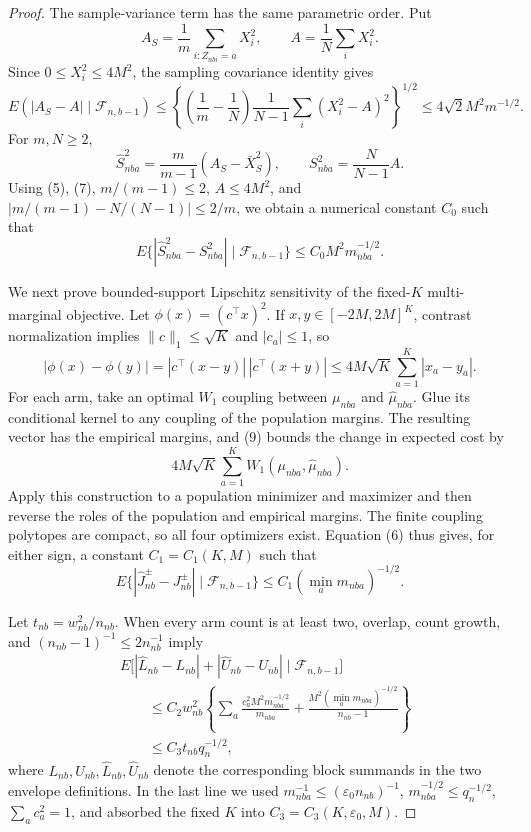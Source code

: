 \documentclass{article}
\begin{document}
\begin{proof}
The sample-variance term has the same parametric order. Put
\[
A_S=\frac1m\sum_{i:Z_{nbi}=a}X_i^2,
\qquad A=\frac1N\sum_iX_i^2.
\]
Since \(0\le X_i^2\le4M^2\), the sampling covariance identity gives
\[
E(|A_S-A|\mid\mathcal F_{n,b-1})
\le\left\{\left(\frac1m-\frac1N\right)
\frac1{N-1}\sum_i(X_i^2-A)^2\right\}^{1/2}
\le4\sqrt2 M^2m^{-1/2}.
\tag{7}
\]
For \(m,N\ge2\),
\[
\widehat S_{nba}^2=\frac{m}{m-1}(A_S-\bar X_S^2),
\qquad S_{nba}^2=\frac{N}{N-1}A.
\]
Using (5), (7), \(m/(m-1)\le2\), \(A\le4M^2\), and
\(|m/(m-1)-N/(N-1)|\le2/m\), we obtain a numerical constant \(C_0\) such that
\[
E\{|\widehat S_{nba}^2-S_{nba}^2|\mid\mathcal F_{n,b-1}\}
\le C_0M^2m_{nba}^{-1/2}.
\tag{8}
\]

We next prove bounded-support Lipschitz sensitivity of the fixed-\(K\) multi-marginal objective. Let \(\phi(x)=(c^\top x)^2\). If \(x,y\in[-2M,2M]^K\), contrast normalization implies \(\|c\|_1\le\sqrt K\) and \(|c_a|\le1\), so
\[
|\phi(x)-\phi(y)|
=|c^\top(x-y)|\,|c^\top(x+y)|
\le4M\sqrt K\sum_{a=1}^K|x_a-y_a|.
\tag{9}
\]
For each arm, take an optimal \(W_1\) coupling between \(\mu_{nba}\) and \(\widehat\mu_{nba}\). Glue its conditional kernel to any coupling of the population margins. The resulting vector has the empirical margins, and (9) bounds the change in expected cost by
\[
4M\sqrt K\sum_{a=1}^K W_1(\mu_{nba},\widehat\mu_{nba}).
\]
Apply this construction to a population minimizer and maximizer and then reverse the roles of the population and empirical margins. The finite coupling polytopes are compact, so all four optimizers exist. Equation (6) thus gives, for either sign, a constant \(C_1=C_1(K,M)\) such that
\[
E\{|\widehat J_{nb}^{\pm}-J_{nb}^{\pm}|\mid\mathcal F_{n,b-1}\}
\le C_1\left(\min_a m_{nba}\right)^{-1/2}.
\tag{10}
\]

Let \(t_{nb}=w_{nb}^2/n_{nb}\). When every arm count is at least two, overlap, count growth, and \((n_{nb}-1)^{-1}\le2n_{nb}^{-1}\) imply
\[
\begin{aligned}
&E\bigl[|\widehat L_{nb}-L_{nb}|+|\widehat U_{nb}-U_{nb}|
\mid\mathcal F_{n,b-1}\bigr]\\
&\qquad\le
C_2w_{nb}^2\left\{
\sum_a\frac{c_a^2M^2m_{nba}^{-1/2}}{m_{nba}}
+\frac{M^2(\min_am_{nba})^{-1/2}}{n_{nb}-1}\right\}\\
&\qquad\le C_3t_{nb}q_n^{-1/2},
\end{aligned}
\tag{11}
\]
where \(L_{nb},U_{nb},\widehat L_{nb},\widehat U_{nb}\) denote the corresponding block summands in the two envelope definitions. In the last line we used \(m_{nba}^{-1}\le(\varepsilon_0n_{nb})^{-1}\), \(m_{nba}^{-1/2}\le q_n^{-1/2}\), \(\sum_ac_a^2=1\), and absorbed the fixed \(K\) into \(C_3=C_3(K,\varepsilon_0,M)\).


\end{proof}
\end{document}

